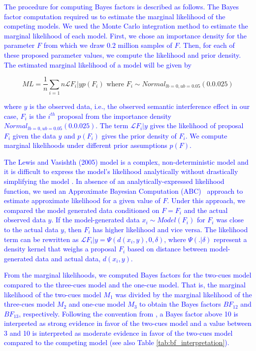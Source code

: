 \documentclass[a4paper, man, floatsintext]{apa7}
\begin{document}
{{\textcolor{blue}{The procedure for computing Bayes factors is described as follows. The Bayes factor computation required us to estimate the marginal likelihood of the competing models. We used the Monte Carlo integration method to estimate the marginal likelihood of each model. First, we chose an importance density for the parameter $F$ from which we draw $0.2$ million samples of $F$. Then, for each of these proposed parameter values, we compute the likelihood and prior density. The estimated marginal likelihood of a model will be given by}

\begin{equation}
ML = \frac{1}{n} \sum_{i=1}{n} \mathcal{L}{F_i|y} p(F_i)  \text{ where } F_i \sim Normal_{lb=0,ub=0.05}(0.0.025) 
\end{equation}

\noindent \textcolor{blue}{where $y$ is the observed data, i.e., the observed semantic interference effect in our case, $F_i$ is the $i^{th}$ proposal from the importance density $Normal_{lb=0,ub=0.05}(0.0.025) $. The term $\mathcal{L}{F_i|y}$ gives the likelihood of proposal $F_i$ given the data $y$ and $p(F_i)$ gives the prior density of $F_i$. We compute marginal likelihoods under different prior assumptions $p(F)$.}

\textcolor{blue}{The Lewis and Vasishth (2005) model is a complex, non-deterministic model and it is difficult to express the model's likelihood analytically without drastically simplifying the model \parencite[e.g., in][]{NicenboimRetrieval2018,lisson2020computational}. In absence of an analytically-expressed likelihood function, we used an Approximate Bayesian Computation (ABC)~\citep{sisson2018handbook,palestro2018likelihood} approach to estimate approximate likelihood for a given value of $F$. Under this approach, we compared the model generated data conditioned on $F=F_i$ and the actual observed data $y$. If the model-generated data $x_{i} \sim Model(F_i)$ for $F_i$ was close to the actual data $y$, then $F_i$ has higher likelihood and vice versa. The likelihood term can be rewritten as $\mathcal{L}{F_i|y} = \Psi(d(x_i, y), 0 , \delta)$, where $\Psi(.|\delta)$ represent a density kernel that weighs a proposal $F_i$ based on distance between model-generated data and actual data, $d(x_i,y)$.}

\textcolor{blue}{From the marginal likelihoods, we computed Bayes factors for the two-cues model compared to the three-cues model and the one-cue model. That is, the marginal likelihood of the two-cues model $M_1$ was divided by the marginal likelihood of the three-cues model $M_2$ and one-cue model $M_3$ to obtain the Bayes factors $BF_{12}$ and $BF_{13}$, respectively. Following the convention from \textcite{jeffreys1998theory}, a Bayes factor above 10 is interpreted as strong evidence in favor of the two-cues model and a value between 3 and 10 is interpreted as moderate evidence in favor of the two-cues model compared to the competing model (see also Table \ref{tab:bf_interpretation}).}

}}
\end{document}
